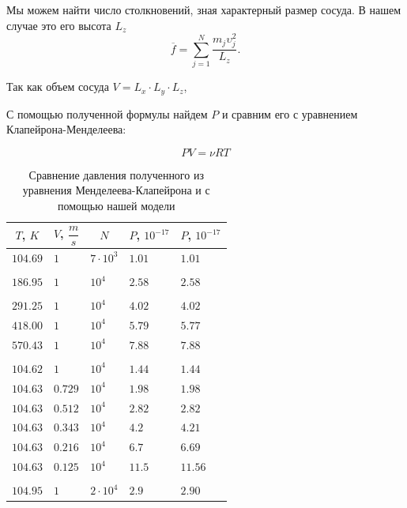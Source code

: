 \documentclass[twoside,twocolumn, 11pt]{article}
\theoremstyle{plain}
\theoremstyle{definition}
\begin{document}
Мы можем найти число столкновений, зная характерный размер сосуда. В нашем случае это его высота $L_z$
\[\overline{f} = \sum_{j = 1}^N \dfrac{m_j \upsilon_j^2}{L_z}.\]

Так как объем сосуда $V = L_x \cdot L_y \cdot L_z$,

\begin{center}
\end{center}

\indent С помощью полученной формулы найдем $P$ и сравним его с уравнением Клапейрона-Менделеева:

\[PV = \nu R T \]

\begin{table}[h!]
\centering
\label{Table 1}
\begin{tabular}{|l|l|l|l|l|}
\hline
\multicolumn{1}{|c|}{$T$, $K$} & \multicolumn{1}{c|}{$V$, $\dfrac{m}{s}$} & \multicolumn{1}{c|}{$N$} & \multicolumn{1}{c|}{$P$, $10^{-17}$} & \multicolumn{1}{c|}{$P$, $10^{-17}$} \\ \hline
$104.69$ & $1$ & $7\cdot 10^3$ & $1.01$ & $1.01$                                    \\
& & & &                                         \\
$186.95$ & $1$ & $10^4$ & $2.58$ & $2.58$                                    \\
& & & &                                         \\
$291.25$ & $1$ & $10^4$ & $4.02$ & $4.02$                                    \\
$418.00$ & $1$ & $10^4$ & $5.79$ & $5.77$                                    \\
$570.43$ & $1$ & $10^4$ & $7.88$ & $7.88$                                    \\
& & & &                                         \\
$104.62$ & $1$ & $10^4$ & $1.44$ & $1.44$                                  \\
$104.63$ & $0.729$ & $10^4$ & $1.98$ & $1.98$                                    \\
$104.63$ & $0.512$ & $10^4$ & $2.82$ & $2.82$                                    \\
$104.63$ & $0.343$ & $10^4$ & $4.2$ & $4.21$                                    \\
$104.63$ & $0.216$ & $10^4$ & $6.7$ & $6.69$                                    \\
$104.63$ & $0.125$ & $10^4$ & $11.5$ & $11.56$                                   \\
& & & &                                         \\
$104.95$ & $1$ & $2 \cdot 10^4$ & $2.9$ & $2.90$                                    \\ \hline
\end{tabular}
\caption{Сравнение давления полученного из уравнения Менделеева-Клапейрона и с помощью нашей модели}
\end{table}
\end{document}
